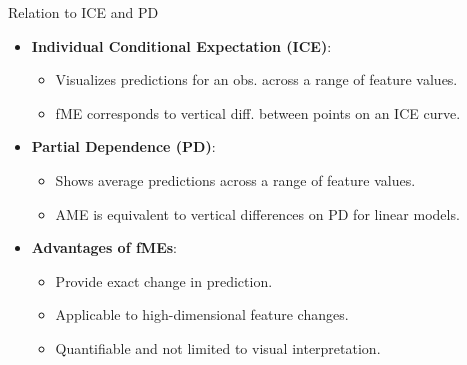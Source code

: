 \documentclass[10pt,compress,t,notes=noshow, xcolor=table]{beamer}
\begin{document}




\begin{frame}{Relation to ICE and PD}
\begin{itemize}
\item \textbf{Individual Conditional Expectation (ICE)}:
\begin{itemize}
\item Visualizes predictions for an obs. across a range of feature values.
\item fME corresponds to vertical diff. between points on an ICE curve.
\end{itemize}
\item \textbf{Partial Dependence (PD)}:
\begin{itemize}
\item Shows average predictions across a range of feature values.
\item AME is equivalent to vertical differences on PD for linear models.
\end{itemize}
\item \textbf{Advantages of fMEs}:
\begin{itemize}
\item Provide exact change in prediction.
\item Applicable to high-dimensional feature changes.
\item Quantifiable and not limited to visual interpretation.
\end{itemize}
\end{itemize}
\end{frame}
\end{document}
